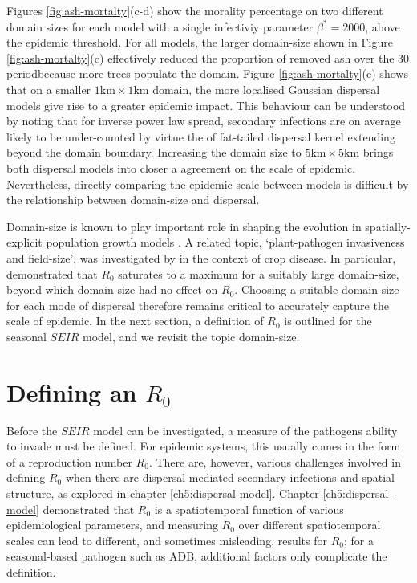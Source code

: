 Figures \ref{fig:ash-mortalty}(c-d) show the morality percentage on two different domain sizes for each model with a single infectiviy parameter $\beta^*=2000$, above the epidemic threshold.
For all models, the larger domain-size shown in Figure \ref{fig:ash-mortalty}(c) effectively reduced the proportion of removed ash over the $30$ period\textemdash because more trees populate the domain. 
Figure \ref{fig:ash-mortalty}(c) shows that on a smaller $1\mathrm{km}\times 1\mathrm{km}$ domain, the more localised Gaussian dispersal models give rise to a greater epidemic impact.
This behaviour can be understood by noting that for inverse power law spread, secondary infections are on average likely to be under-counted
by virtue the of fat-tailed dispersal kernel extending beyond the domain boundary.
Increasing the domain size to $5\mathrm{km}\times 5\mathrm{km}$ brings both dispersal models into closer a agreement on the scale of epidemic.
Nevertheless, directly comparing the epidemic-scale between models is difficult by the relationship between domain-size and dispersal.

Domain-size is known to play important role in shaping the evolution in spatially-explicit population growth models \cite{tang2011asymptotic}.
A related topic, `plant-pathogen invasiveness and field-size', was investigated by \cite{mikaberidze2016invasiveness} in the context of crop disease.
In particular, \cite{mikaberidze2016invasiveness} demonstrated that $R_0$ saturates to a maximum for a suitably large domain-size, beyond which domain-size had no effect on $R_0$.
Choosing a suitable domain size for each mode of dispersal therefore remains critical to accurately capture the scale of epidemic.
In the next section, a definition of $R_0$ is outlined for the seasonal $SEIR$ model, and we revisit the topic domain-size.

\section{Defining an $R_0$}


Before the $SEIR$ model can be investigated, a measure of the pathogens ability to invade must be defined. For epidemic systems, this usually comes in the form of a reproduction number $R_0$. There are, however, various challenges involved in defining $R_0$ when there are dispersal-mediated secondary infections and spatial structure, as explored in chapter \ref{ch5:dispersal-model}. Chapter \ref{ch5:dispersal-model} demonstrated that $R_0$ is a spatiotemporal function of various epidemiological parameters, and measuring $R_0$ over different spatiotemporal scales can lead to different, and sometimes misleading, results for $R_0$; for a seasonal-based pathogen such as ADB, additional factors only complicate the definition. 

